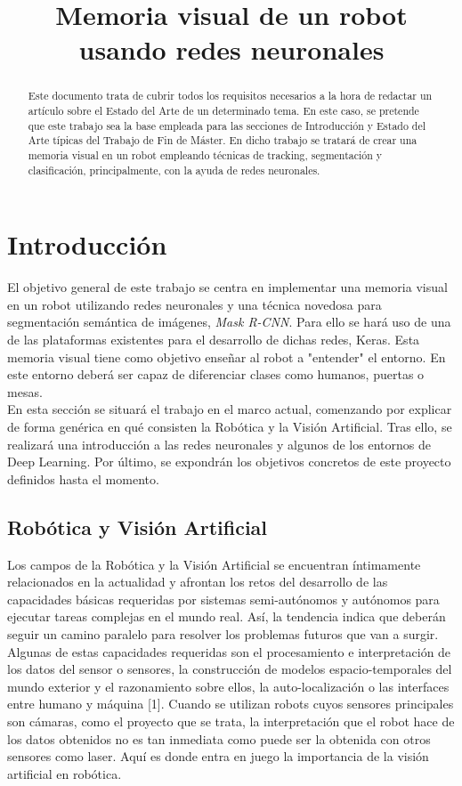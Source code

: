 \documentclass{bmvc2k}
\title{Memoria visual de un robot usando redes neuronales}
\begin{document}
\maketitle

\begin{abstract}
Este documento trata de cubrir todos los requisitos necesarios a la hora
de redactar un artículo sobre el Estado del Arte de un determinado tema.
En este caso, se pretende que este trabajo sea la base empleada para las secciones
de Introducción y Estado del Arte típicas del Trabajo de Fin de Máster.
En dicho trabajo se tratará de crear una memoria visual en un robot empleando técnicas de tracking, segmentación y clasificación,
principalmente, con la ayuda de redes neuronales.
\end{abstract}

\section{Introducción}
\label{sec:intro}
El objetivo general de este trabajo se centra en implementar una memoria visual en un robot
utilizando redes neuronales y una técnica novedosa para segmentación semántica de imágenes, \textit{Mask R-CNN}. Para ello se hará uso de una de las plataformas existentes para el desarrollo de dichas redes, Keras. Esta memoria visual tiene como objetivo enseñar al robot a "entender" el entorno. En este entorno deberá ser capaz de diferenciar clases como humanos, puertas o mesas.\\

En esta sección se situará el trabajo en el marco actual, comenzando por explicar de forma genérica en qué consisten la Robótica y la Visión Artificial. Tras ello, se realizará una introducción a las redes neuronales y algunos de los entornos de Deep Learning. Por último, se expondrán los objetivos concretos de este proyecto definidos hasta el momento.

\subsection{Robótica y Visión Artificial}
Los campos de la Robótica y la Visión Artificial se encuentran íntimamente relacionados en la actualidad y afrontan los retos del desarrollo de las capacidades básicas requeridas por sistemas semi-autónomos y autónomos para ejecutar tareas complejas en el mundo real. Así, la tendencia indica que deberán seguir un camino paralelo para resolver los problemas futuros que van a surgir. Algunas de estas capacidades requeridas son el procesamiento e interpretación de los datos del sensor o sensores, la construcción de modelos espacio-temporales del mundo exterior y el razonamiento sobre ellos, la auto-localización o las interfaces entre humano y máquina [1]. Cuando se utilizan robots cuyos sensores principales son cámaras, como el proyecto que se trata, la interpretación que el robot hace de los datos obtenidos no es tan inmediata como puede ser la obtenida con otros sensores como laser. Aquí es donde entra en juego la importancia de la visión artificial en robótica.
\end{document}
